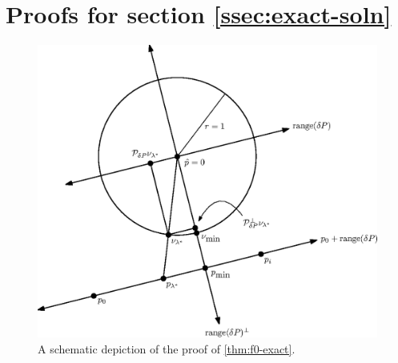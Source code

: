 \documentclass[sisc-eikonal.tex]{subfiles}
\begin{document}
\section{Proofs for section
  \ref{ssec:exact-soln}}\label{sec:exact-soln-proofs}

\begin{figure}
  \centering \includegraphics[width=0.9\linewidth]{f0-exact.eps}
  \caption{A schematic depiction of the proof of
    \cref{thm:f0-exact}.}\label{fig:f0-exact}
\end{figure}
\end{document}
